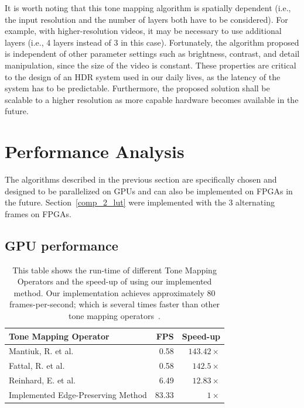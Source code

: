 It is worth noting that this tone mapping algorithm is spatially dependent (i.e., the input resolution and 
the number of layers both have to be considered). For example, with higher-resolution videos, it may 
be necessary to use additional layers (i.e., 4 layers instead of 3 in this case). Fortunately, the 
algorithm proposed is independent of other parameter settings such as brightness, contrast, and 
detail manipulation, since the size of the video is constant. These properties are critical to the design 
of an HDR system used in our daily lives, as the latency of the system has to be predictable. 
Furthermore, the proposed solution shall be scalable to a higher resolution as more capable 
hardware becomes available in the future.

\section{Performance Analysis}
The algorithms described in the previous section are specifically chosen and designed to be 
parallelized on GPUs and can also be implemented on FPGAs in the future.
Section~\ref{comp_2_lut} were implemented with the 3 alternating frames on FPGAs.
\subsection{GPU performance}
\begin{table}[!h]
\center
\begin{tabular}{|l|r|r|}
\hline
\bf{Tone Mapping Operator} & \bf{FPS} & \bf{Speed-up}\\
\hline
Mantiuk, R. et al. \cite{mantiuk2006perceptual}     & 0.58              & $143.42\times$\\
\hline
Fattal, R. et al. \cite{fattal2002gradient}        & 0.58              & $142.5\times$\\
\hline
Reinhard, E. et al. \cite{reinhard2002photographic}     & 6.49              & $12.83\times$\\
\hline
Implemented Edge-Preserving Method          & 83.33             & $1\times$\\
\hline
\end{tabular}
\caption{This table shows the run-time of different Tone Mapping Operators and the speed-up of 
using our implemented method. Our implementation 
achieves approximately 80 frames-per-second; which is several times faster than other tone mapping 
operators~\cite{lo2012high}.}
\label{perf_table}
\end{table}

